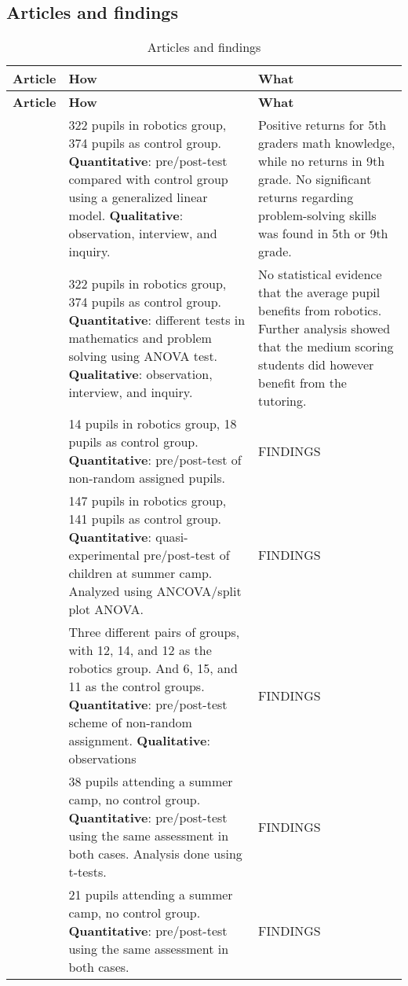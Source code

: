 \subsection*{Articles and findings}
\setlength\LTleft{0px}
\setlength\LTright{0px}
\begin{longtable}{@{\extracolsep{\fill}}p{}p{}@{\hspace{20pt}}p{}}
	\hline \multicolumn{1}{l}{\textbf{Article}} & \multicolumn{1}{l}{\textbf{How}} & \multicolumn{1}{l}{\textbf{What}} \\ \hline\hline
	\endfirsthead
	\hline \multicolumn{1}{l}{\textbf{Article}} & \multicolumn{1}{l}{\textbf{How}} & \multicolumn{1}{l}{\textbf{What}} \\ \hline\hline
	\endhead
	\hline \caption{Articles and findings}\endlastfoot
	\tcite{hussain2006effect} & 322 pupils in robotics group, 374 pupils as control group. \textbf{Quantitative}: pre/post-test compared with control group using a generalized linear model. \textbf{Qualitative}: observation, interview, and inquiry. & Positive returns for 5th graders math knowledge, while no returns in 9th grade. No significant returns regarding problem-solving skills was found in 5th or 9th grade. \\\hline
	
	\tcite{lindh2007does} & 322 pupils in robotics group, 374 pupils as control group. \textbf{Quantitative}: different tests in mathematics and problem solving using ANOVA test. \textbf{Qualitative}: observation, interview, and inquiry. &  No statistical evidence that the average pupil benefits from robotics. Further analysis showed that the medium scoring students did however benefit from the tutoring. \\\hline
	
	\tcite{barker2007robotics} & 14 pupils in robotics group, 18 pupils as control group. \textbf{Quantitative}: pre/post-test of non-random assigned pupils. & FINDINGS \\\hline
	\tcite{nugent2009use} & 147 pupils in robotics group, 141 pupils as control group. \textbf{Quantitative}: quasi-experimental pre/post-test of children at summer camp. Analyzed using ANCOVA/split plot ANOVA. & FINDINGS \\\hline
	
	\tcite{mitnik2008autonomous} & Three different pairs of groups, with 12, 14, and 12 as the robotics group. And 6, 15, and 11 as the control groups. \textbf{Quantitative}: pre/post-test scheme of non-random assignment. \textbf{Qualitative}: observations  & FINDINGS \\\hline
	
	\tcite{nugent2008effect} & 38 pupils attending a summer camp, no control group. \textbf{Quantitative}: pre/post-test using the same assessment in both cases. Analysis done using t-tests. & FINDINGS \\\hline
	
	\tcite{williams2007acquisition} & 21 pupils attending a summer camp, no control group. \textbf{Quantitative}: pre/post-test using the same assessment in both cases.  & FINDINGS \\\hline
\end{longtable}
